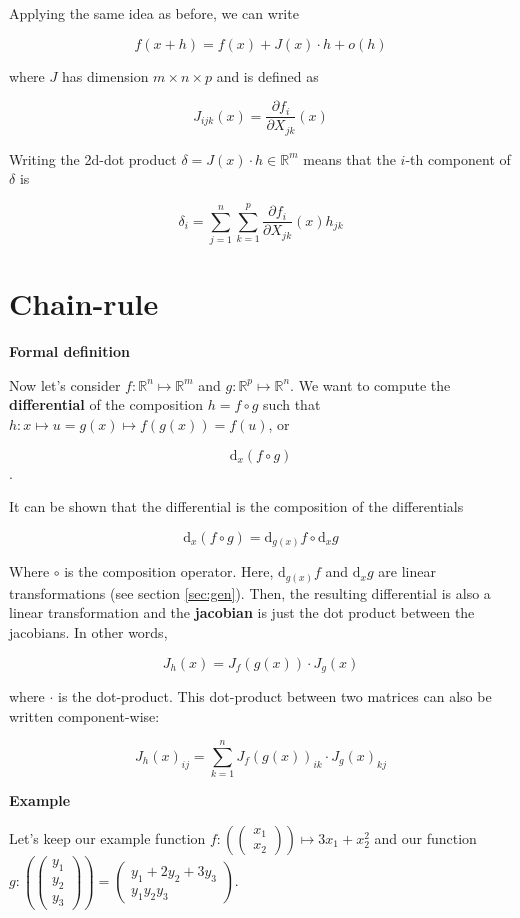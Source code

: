 \documentclass{tufte-handout}
\newcommand{\ud}{\mathrm{d}}
\begin{document}
Applying the same idea as before, we can write

$$ f(x + h) = f(x) + J(x) \cdot h + o(h) $$

where $ J $ has dimension $ m \times n \times p $ and is defined as

$$ J_{ijk}(x) = \frac{\partial f_i}{\partial X_{jk}} (x) $$

Writing the 2d-dot product $ \delta =  J(x) \cdot h \in \mathbb{R}^m $ means that the $i$-th component of $ \delta $ is

$$ \delta_i = \sum_{j=1}^n \sum_{k=1}^p \frac{\partial f_i}{\partial X_{jk}} (x) h_{jk} $$

\section{Chain-rule}

\textbf{Formal definition}

Now let's consider $ f: \mathbb{R}^n \mapsto \mathbb{R}^m $ and $ g: \mathbb{R}^p \mapsto \mathbb{R}^n $. We want to compute the \textbf{differential} of the composition $ h = f \circ g $ such that $ h :x \mapsto u = g(x) \mapsto f(g(x)) = f(u) $, or

$$ \ud_x (f \circ g) $$.

It can be shown that the differential is the composition of the differentials

$$ \ud_x (f \circ g) = \ud_{g(x)} f \circ \ud_x g $$

Where $ \circ $ is the composition operator. Here, $ \ud_{g(x)} f $ and $ \ud_x g $ are linear transformations (see section \ref{sec:gen}). Then, the resulting differential is also a linear transformation and the \textbf{jacobian} is just the dot product between the jacobians. In other words,


$$J_h(x) = J_f(g(x)) \cdot J_g(x) $$ 

where $ \cdot $ is the dot-product. This dot-product between two matrices can also be written component-wise:

$$ J_h(x)_{ij} = \sum_{k=1}^n J_f (g(x))_{ik} \cdot J_g(x)_{kj}$$

\textbf{Example}

Let's keep our example function $ f : (\begin{pmatrix}
x_1\\x_2
\end{pmatrix}) \mapsto 3x_1 + x_2^2 $ and our function  
$ g : (\begin{pmatrix}
y_1\\y_2\\y_3
\end{pmatrix}) = \begin{pmatrix}
y_1 + 2y_2 + 3y_3\\ y_1y_2y_3
\end{pmatrix} $.
\end{document}
